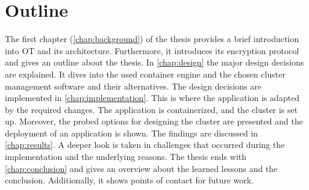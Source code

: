 \section{Outline}
The first chapter (\autoref{chap:background}) of the thesis provides a brief introduction into \ac{OT} and its architecture. Furthermore, it introduces its encryption protocol and gives an outline about the thesis. In \autoref{chap:design} the major design decisions are explained. It dives into the used container engine and the chosen cluster management software and their alternatives.
The design decisions are implemented in \autoref{chap:implementation}. This is where the application is adapted by the required changes. The application is containerized, and the cluster is set up. Moreover, the probed options for designing the cluster are presented and the deployment of an application is shown.
The findings are discussed in \autoref{chap:results}. A deeper look is taken in challenges that occurred during the implementation and the underlying reasons.
The thesis ends with \autoref{chap:conclusion} and gives an overview about the learned lessons and the conclusion. Additionally, it shows points of contact for future work.
